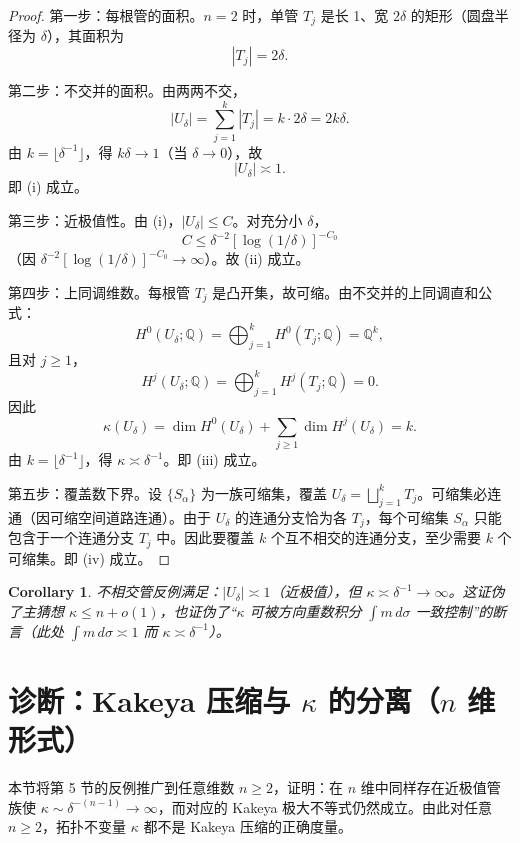\documentclass[11pt,a4paper]{article}
\newtheorem{corollary}[theorem]{Corollary}
\theoremstyle{remark}
\begin{document}
		\begin{proof}
		第一步：每根管的面积。$n=2$ 时，单管 $T_j$ 是长 1、宽 $2\delta$ 的矩形（圆盘半径为 $\delta$），其面积为
		\[|T_j|=2\delta.\]
		
		第二步：不交并的面积。由两两不交，
		\[|U_\delta|=\sum_{j=1}^k|T_j|=k\cdot2\delta=2k\delta.\]
		由 $k=\lfloor\delta^{-1}\rfloor$，得 $k\delta\to1$（当 $\delta\to0$），故
		\[|U_\delta|\asymp1.\]
		即 (i) 成立。
		
		第三步：近极值性。由 (i)，$|U_\delta|\le C$。对充分小 $\delta$，
		\[C\le\delta^{-2}[\log(1/\delta)]^{-C_0}\]
		（因 $\delta^{-2}[\log(1/\delta)]^{-C_0}\to\infty$）。故 (ii) 成立。
		
		第四步：上同调维数。每根管 $T_j$ 是凸开集，故可缩。由不交并的上同调直和公式：
		\[H^0(U_\delta;\mathbb Q)=\bigoplus_{j=1}^kH^0(T_j;\mathbb Q)=\mathbb Q^k,\]
		且对 $j\ge1$，
		\[H^j(U_\delta;\mathbb Q)=\bigoplus_{j=1}^kH^j(T_j;\mathbb Q)=0.\]
		因此
		\[\kappa(U_\delta)=\dim H^0(U_\delta)+\sum_{j\ge1}\dim H^j(U_\delta)=k.\]
		由 $k=\lfloor\delta^{-1}\rfloor$，得 $\kappa\asymp\delta^{-1}$。即 (iii) 成立。
		
		第五步：覆盖数下界。设 $\{S_\alpha\}$ 为一族可缩集，覆盖 $U_\delta=\bigsqcup_{j=1}^kT_j$。可缩集必连通（因可缩空间道路连通）。由于 $U_\delta$ 的连通分支恰为各 $T_j$，每个可缩集 $S_\alpha$ 只能包含于一个连通分支 $T_j$ 中。因此要覆盖 $k$ 个互不相交的连通分支，至少需要 $k$ 个可缩集。即 (iv) 成立。
		\end{proof}
		
		\begin{corollary}
		不相交管反例满足：$|U_\delta|\asymp1$（近极值），但 $\kappa\asymp\delta^{-1}\to\infty$。这证伪了主猜想 $\kappa\le n+o(1)$，也证伪了“$\kappa$ 可被方向重数积分 $\int m\,d\sigma$ 一致控制”的断言（此处 $\int m\,d\sigma\asymp1$ 而 $\kappa\asymp\delta^{-1}$）。
		\end{corollary}

		
		\section{诊断：Kakeya 压缩与 \texorpdfstring{$\kappa$}{κ} 的分离（$n$ 维形式）}
		本节将第 5 节的反例推广到任意维数 $n\ge2$，证明：在 $n$ 维中同样存在近极值管族使 $\kappa\sim\delta^{-(n-1)}\to\infty$，而对应的 Kakeya 极大不等式仍然成立。由此对任意 $n\ge2$，拓扑不变量 $\kappa$ 都不是 Kakeya 压缩的正确度量。
		
\end{document}

